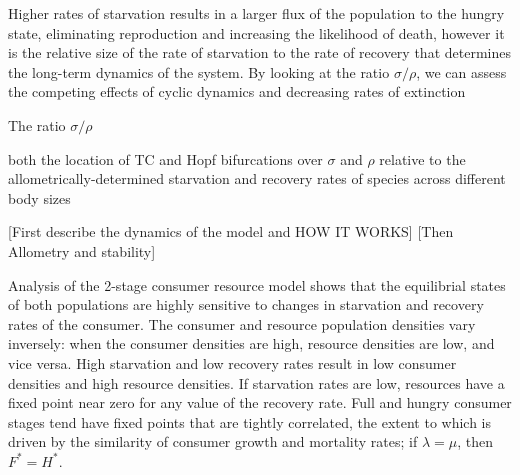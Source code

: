 \documentclass[12pt,english]{article}
\begin{document}
\begin{spacing}{1.9}
Higher rates of starvation results in a larger flux of the population to the hungry state, eliminating reproduction and increasing the likelihood of death, however it is the relative size of the rate of starvation to the rate of recovery that determines the long-term dynamics of the system.
By looking at the ratio $\sigma/\rho$, we can assess the competing effects of cyclic dynamics and decreasing rates of extinction

The ratio $\sigma/\rho$  






both the location of TC and Hopf bifurcations over $\sigma$ and $\rho$ relative to the allometrically-determined starvation and recovery rates of species across different body sizes 

[First describe the dynamics of the model and HOW IT WORKS]
[Then Allometry and stability]

Analysis of the 2-stage consumer resource model shows that the equilibrial states of both populations are highly sensitive to changes in  starvation and recovery rates of the consumer.
The consumer and resource population densities vary inversely: when the consumer densities are high, resource densities are low, and vice versa.
High starvation and low recovery rates result in low consumer densities and high resource densities. %
If starvation rates are low, resources have a fixed point near zero for any value of the recovery rate.
Full and hungry consumer stages tend have fixed points that are tightly correlated, the extent to which is driven by the similarity of consumer growth and mortality rates; if $\lambda = \mu$, then $F^* = H^*$.


\end{spacing}
\end{document}
